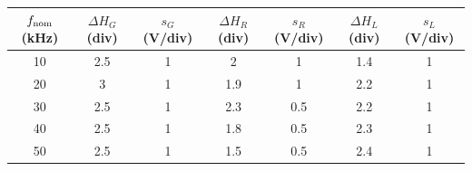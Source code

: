 \begin{center}
\begin{minipage}{\linewidth}\centering
\small
\setlength{\tabcolsep}{5pt}
\label{tab:rl_escalas}
\begin{tabular}{ccccccc}
\toprule
$f_{\rm nom}$ (kHz) & $\Delta H_G$ (div) & $s_G$ (V/div) & $\Delta H_R$ (div) & $s_R$ (V/div) & $\Delta H_L$ (div) & $s_L$ (V/div) \\
\midrule
\num{10} & \num{2.5} & \num{1} & \num{2} & \num{1} & \num{1.4} & \num{1} \\
\num{20} & \num{3} & \num{1} & \num{1.9} & \num{1} & \num{2.2} & \num{1} \\
\num{30} & \num{2.5} & \num{1} & \num{2.3} & \num{0.5} & \num{2.2} & \num{1} \\
\num{40} & \num{2.5} & \num{1} & \num{1.8} & \num{0.5} & \num{2.3} & \num{1} \\
\num{50} & \num{2.5} & \num{1} & \num{1.5} & \num{0.5} & \num{2.4} & \num{1} \\
\bottomrule
\end{tabular}
\end{minipage}
\end{center}
